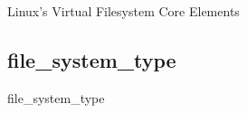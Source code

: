 \documentclass{beamer}
\begin{document}
\begin{frame}{Linux's Virtual Filesystem Core Elements}
	

\end{frame}

\subsection{file\_system\_type}

\begin{frame}{file\_system\_type}
	
	
\end{frame}
\end{document}
